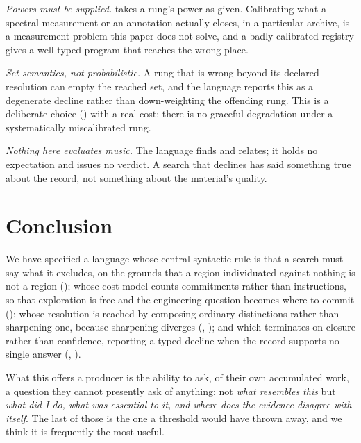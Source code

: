 \documentclass[11pt,twocolumn,a4paper]{article}
\theoremstyle{definition}
\theoremstyle{remark}
\begin{document}
\emph{Powers must be supplied.}  takes a rung's power as given.
Calibrating what a spectral measurement or an annotation actually closes, in a
particular archive, is a measurement problem this paper does not solve, and a
badly calibrated registry gives a well-typed program that reaches the wrong
place.

\emph{Set semantics, not probabilistic.} A rung that is wrong beyond its declared
resolution can empty the reached set, and the language reports this as a
degenerate decline rather than down-weighting the offending rung. This is a
deliberate choice () with a real cost: there is no graceful
degradation under a systematically miscalibrated rung.

\emph{Nothing here evaluates music.} The language finds and relates; it holds no
expectation and issues no verdict. A search that declines has said something
true about the record, not something about the material's quality.

\section{Conclusion}
\label{sec:conclusion}

We have specified a language whose central syntactic rule is that a search must
say what it excludes, on the grounds that a region individuated against nothing
is not a region (); whose cost model counts commitments
rather than instructions, so that exploration is free and the engineering
question becomes where to commit (); whose resolution is reached by
composing ordinary distinctions rather than sharpening one, because sharpening
diverges (, ); and which terminates on
closure rather than confidence, reporting a typed decline when the record
supports no single answer (,
).

What this offers a producer is the ability to ask, of their own accumulated work,
a question they cannot presently ask of anything: not \emph{what resembles this}
but \emph{what did I do, what was essential to it, and where does the evidence
disagree with itself}. The last of those is the one a threshold would have
thrown away, and we think it is frequently the most useful.



\end{document}
